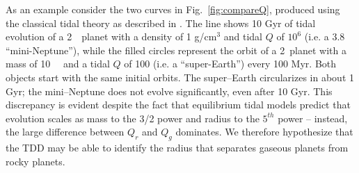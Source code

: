 As an example consider the two curves in Fig.~\ref{fig:compareQ}, produced using the classical tidal theory as described in \cite{Barnes13}.  The
line shows 10 Gyr of tidal evolution of a 2~\rearth~planet with a
density of 1 g/cm$^3$ and tidal $Q$ of $10^6$ (i.e. a 3.8~\mearth~
``mini-Neptune''), while the filled circles represent the orbit of a
2~\rearth planet with a mass of 10~\mearth~ and a tidal $Q$ of 100
(i.e. a ``super-Earth'') every 100 Myr.  Both objects start with the
same initial orbits.  The super--Earth circularizes in about 1 Gyr;
the mini--Neptune does not evolve significantly, even after 10 Gyr.
This discrepancy is evident despite the fact that equilibrium tidal
models predict that evolution scales as mass to the 3/2 power and
radius to the $5^{th}$ power -- instead, the large difference between
$Q_r$ and $Q_g$ dominates.  We therefore hypothesize that the TDD may
be able to identify the radius that separates gaseous planets from
rocky planets.

